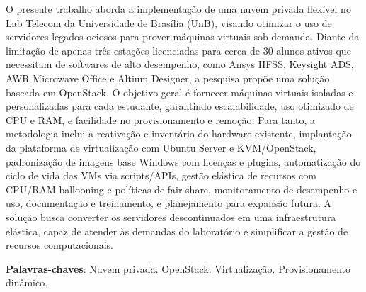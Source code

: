 \begin{resumo}

O presente trabalho aborda a implementação de uma nuvem privada flexível no Lab Telecom da Universidade de Brasília (UnB), visando otimizar o uso de servidores legados ociosos para prover máquinas virtuais sob demanda. Diante da limitação de apenas três estações licenciadas para cerca de 30 alunos ativos que necessitam de softwares de alto desempenho, como Ansys HFSS, Keysight ADS, AWR Microwave Office e Altium Designer, a pesquisa propõe uma solução baseada em OpenStack. O objetivo geral é fornecer máquinas virtuais isoladas e personalizadas para cada estudante, garantindo escalabilidade, uso otimizado de CPU e RAM, e facilidade no provisionamento e remoção. Para tanto, a metodologia inclui a reativação e inventário do hardware existente, implantação da plataforma de virtualização com Ubuntu Server e KVM/OpenStack, padronização de imagens base Windows com licenças e plugins, automatização do ciclo de vida das VMs via scripts/APIs, gestão elástica de recursos com CPU/RAM ballooning e políticas de fair-share, monitoramento de desempenho e uso, documentação e treinamento, e planejamento para expansão futura. A solução busca converter os servidores descontinuados em uma infraestrutura elástica, capaz de atender às demandas do laboratório e simplificar a gestão de recursos computacionais.

 \vspace{\onelineskip}
    
 \noindent
 \textbf{Palavras-chaves}: Nuvem privada. OpenStack. Virtualização. Provisionamento dinâmico.
\end{resumo}

